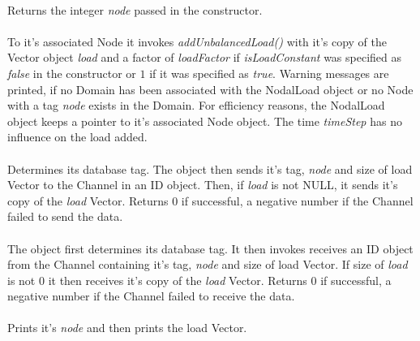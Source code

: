  \\
Returns the integer {\em node} passed in the constructor. \\

 \\
To it's associated Node it invokes {\em addUnbalancedLoad()} with it's
copy of the Vector object {\em load} and a factor of {\em loadFactor}
if {\em isLoadConstant} was specified as {\em false} in the constructor or
$1$ if it was specified as {\em true}. Warning
messages are printed, if no Domain has been associated with the
NodalLoad object or no Node with a tag {\em node} exists in the
Domain. For efficiency reasons, the NodalLoad object keeps a pointer
to it's associated Node object. The time {\em timeStep} has no
influence on the load added. \\

 \\
Determines its database tag. The object then sends it's tag, {\em
node} and size of load Vector to the Channel in an ID object. Then, if
{\em load} is not NULL, it sends it's copy of the {\em load}
Vector. Returns $0$ if successful, a negative number if the Channel
failed to send the data. \\  

 \\
The object first determines its database tag. It then invokes receives
an ID object from the Channel containing it's tag, {\em node} and size
of load Vector. If size of {\em load} is not $0$ it then receives it's
copy of the {\em load} Vector. Returns $0$ if successful, a negative 
number if the Channel failed to receive the data. \\ 

 \\
Prints it's {\em node} and then prints the load Vector. \\


